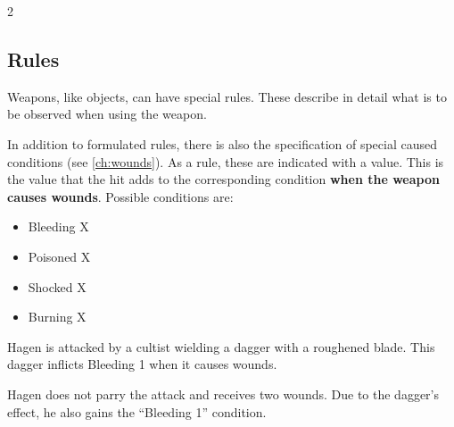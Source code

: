 \begin{multicols}{2}

\subsection{Rules}

Weapons, like objects, can have special rules. These describe in detail what is to be observed when using the weapon.

In addition to formulated rules, there is also the specification of special caused conditions (see \cref{ch:wounds}). As a rule, these are indicated with a value. This is the value that the hit adds to the corresponding condition \textbf{when the weapon causes wounds}. Possible conditions are:
\begin{itemize}
    \item Bleeding X
    \item Poisoned X
    \item Shocked X
    \item Burning X
\end{itemize}

\begin{pexample}[Example]
Hagen is attacked by a cultist wielding a dagger with a roughened blade. This dagger inflicts Bleeding 1 when it causes wounds.

Hagen does not parry the attack and receives two wounds. Due to the dagger's effect, he also gains the ``Bleeding 1'' condition.
\end{pexample}


\end{multicols}
